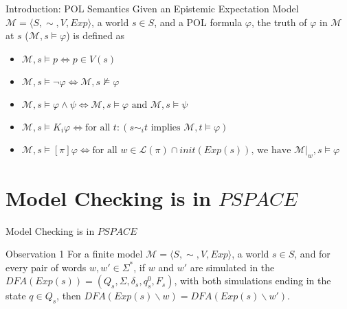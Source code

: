 \documentclass{beamer}
\newcommand\ldiaarg[1]{\langle#1\rangle}
\newcommand{\M}{\mathcal{M}}
\newcommand{\LL}{\mathcal{L}} %
\begin{document}
\begin{frame}{Introduction: POL Semantics}
    Given an Epistemic Expectation Model $\M = \ldiaarg{S, \sim, V, Exp}$, a world $s\in S$, and a POL formula $\varphi$, the truth of $\varphi$ in $\M$ at $s$ ($\M,s\vDash\varphi$) is defined as
    \begin{itemize}
        \item<1-> $\M,s\vDash p \Leftrightarrow p\in V(s)$
        \item<2-> $\M,s\vDash \neg\varphi \Leftrightarrow   \M,s\nvDash \varphi$
        \item<3-> $\M,s\vDash \varphi\land \psi \Leftrightarrow \M,s\vDash \varphi \mbox{ and } \M,  s\vDash \psi$
        \item<4-> $\M,s\vDash K_i\varphi \Leftrightarrow \mbox{for all }t: (s\sim_i t  \mbox{ implies } \M,t\vDash\varphi)$
        \item<5-> $\M,s\vDash [\pi]\varphi \Leftrightarrow \mbox{for all }w\in\LL(\pi) \cap \mathit{init}(Exp(s))\mbox{, we have }\M|_w,s\vDash \varphi$
    \end{itemize}
\end{frame}

\section{Model Checking is in $PSPACE$}

\begin{frame}{Model Checking is in $PSPACE$}
    \begin{block}{Observation 1}
    For a finite model $\M = \langle S,\sim,V,Exp\rangle$, a world $s\in S$, and for every pair of words $w, w'\in \Sigma^*$, if $w$ and $w'$ are simulated in the $DFA(Exp(s)) = (Q_s, \Sigma, \delta_s, q^0_s, F_s)$, with both simulations ending in the state $q\in Q_s$, then $DFA(Exp(s)\backslash w) = DFA(Exp(s)\backslash w')$.
    \label{observation:prefixstatequivalence}
    \end{block}
\end{frame}
\end{document}
